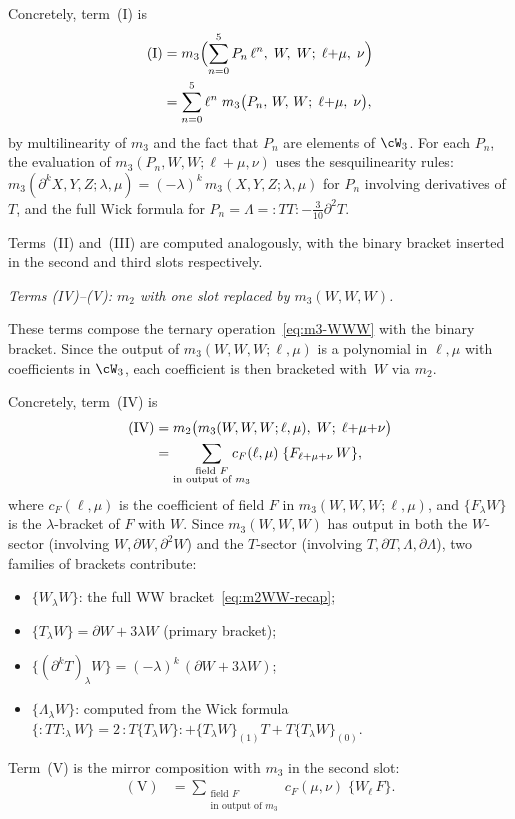 Concretely, term~(I) is
\begin{align}
\label{eq:term-I}
\mathrm{(I)} &=
m_3\Bigl(\sum_{n=0}^{5} P_n\,\ell^n,\; W,\; W;\;
 \ell{+}\mu,\; \nu\Bigr) \notag\\
&= \sum_{n=0}^{5} \ell^n\;
 m_3\bigl(P_n,\, W,\, W;\; \ell{+}\mu,\; \nu\bigr),
\end{align}
by multilinearity of $m_3$ and the fact that
$P_n$ are elements of $\cW_3$. For each $P_n$, the evaluation of
$m_3(P_n, W, W; \ell{+}\mu, \nu)$ uses the sesquilinearity rules:
$m_3(\partial^k X, Y, Z; \lambda, \mu)
 = (-\lambda)^k\, m_3(X, Y, Z; \lambda, \mu)$
for $P_n$ involving derivatives of $T$, and the full Wick formula
for $P_n = \Lambda = {:}TT{:} - \tfrac{3}{10}\partial^2 T$.

Terms~(II) and~(III) are computed analogously, with the
binary bracket inserted in the second and third slots respectively.

\smallskip
\emph{Terms (IV)--(V): $m_2$ with one slot replaced by $m_3(W,W,W)$.}

These terms compose the ternary operation~\eqref{eq:m3-WWW} with
the binary bracket. Since the output of $m_3(W,W,W;\ell,\mu)$
is a polynomial in $\ell, \mu$ with coefficients in $\cW_3$, each
coefficient is then bracketed with~$W$ via $m_2$.

Concretely, term~(IV) is
\begin{align}
\label{eq:term-IV}
\mathrm{(IV)} &=
m_2\bigl(m_3(W,W,W;\ell,\mu),\; W;\;
 \ell{+}\mu{+}\nu\bigr) \notag\\
&= \sum_{\substack{\text{field } F \\ \text{in output of } m_3}}
\!\!\!\!\!\!\!\!\!
c_F(\ell,\mu)\;\{F_{\ell+\mu+\nu}\, W\},
\end{align}
where $c_F(\ell,\mu)$ is the coefficient of field $F$ in
$m_3(W,W,W;\ell,\mu)$, and $\{F_\lambda W\}$ is the $\lambda$-bracket
of $F$ with $W$. Since $m_3(W,W,W)$ has output in both the
$W$-sector (involving $W, \partial W, \partial^2 W$) and the
$T$-sector (involving $T, \partial T, \Lambda, \partial\Lambda$),
two families of brackets contribute:
\begin{itemize}
\item $\{W_\lambda W\}$: the full WW bracket~\eqref{eq:m2WW-recap};
\item $\{T_\lambda W\} = \partial W + 3\lambda W$ (primary bracket);
\item $\{(\partial^k T)_\lambda W\} = (-\lambda)^k\,(\partial W + 3\lambda W)$;
\item $\{\Lambda_\lambda W\}$: computed from the Wick formula
$\{{:}TT{:}_\lambda W\} = 2\,{:}T\{T_\lambda W\}{:}
+ \{T_\lambda W\}_{(1)} T + T\{T_\lambda W\}_{(0)}$.
\end{itemize}
Term~(V) is the mirror composition with $m_3$ in the second slot:
\begin{align}
\label{eq:term-V}
\mathrm{(V)} &=
\sum_{\substack{\text{field } F \\ \text{in output of } m_3}}
\!\!\!\!\!\!\!\!\!
c_F(\mu,\nu)\;\{W_\ell\, F\}.
\end{align}

